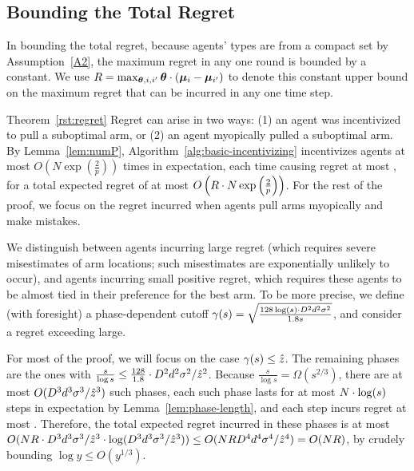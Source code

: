 \subsection{Bounding the Total Regret}
In bounding the total regret, because agents' types are from a compact
set by Assumption~\ref{A2}, the maximum regret in any one round is
bounded by a constant.
We use $R = \max_{\bm{\theta}, i,i'} \bm{\theta} \cdot (\bm{\mu}_{i} - \bm{\mu}_{i'})$
to denote this constant upper bound on the maximum regret that can be
incurred in any one time step. 


\begin{emptyextraproof}{Theorem~\ref{rst:regret}}
Regret can arise in two ways:
(1) an agent was incentivized to pull a suboptimal arm, or
(2) an agent myopically pulled a suboptimal arm.
By Lemma~\ref{lem:numP}, Algorithm~\ref{alg:basic-incentivizing}
incentivizes agents at most 
$O\left( N\exp\left(\frac{2}{p}\right) \right)$
times in expectation, each time causing regret at most \MAXR,
for a total expected regret of at most
$O\left(R\cdot N\exp\left(\frac{2}{p}\right) \right)$.
For the rest of the proof, we focus on the regret incurred when agents
pull arms myopically and make mistakes.

We distinguish between agents incurring large regret
(which requires severe misestimates of arm locations;
such misestimates are exponentially unlikely to occur), 
and agents incurring small positive regret,
which requires these agents to be almost tied in their preference for
the best arm.
To be more precise, we define (with foresight) a phase-dependent
cutoff
$\EarlyCut{s} = \sqrt{\frac{128\log(s) \cdot \Diam^2 d^2 \sigma^2}{1.8 s}}$,
and consider a regret exceeding  large.

For most of the proof, we will focus on the case $\EarlyCut{s} \leq \TieCutoff$.
The remaining phases are the ones with
$\frac{s}{\log s} \leq \frac{128}{1.8} \cdot D^2 d^2 \sigma^2/\hat{z}^2$.
Because $\frac{s}{\log s} = \Omega(s^{2/3})$, there are at most
$O(D^3 d^3 \sigma^3/\hat{z}^3)$ such phases,
each such phase lasts for at most $N \cdot \log(s)$ steps
in expectation by Lemma~\ref{lem:phase-length},
and each step incurs regret at most \MAXR.
Therefore, the total expected regret incurred in these phases is at most
$O(N R \cdot D^3 d^3 \sigma^3/\hat{z}^3
\cdot \log (D^3 d^3 \sigma^3/\hat{z}^3))
\leq O(N R D^4 d^4 \sigma^4/\hat{z}^4)
= O(N R)$,
by crudely bounding $\log y \leq O(y^{1/3})$.


\end{emptyextraproof}
